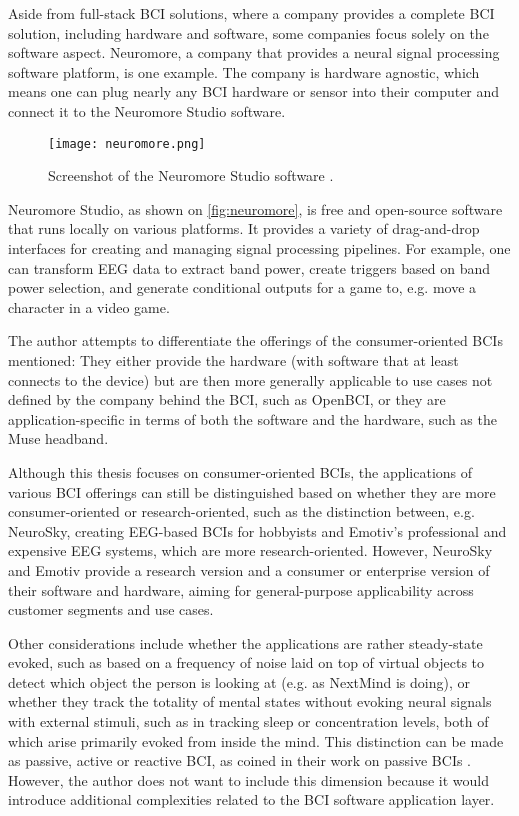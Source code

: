 Aside from full-stack BCI solutions, where a company provides a complete BCI solution, including hardware and software, some companies focus solely on the software aspect. Neuromore, a company that provides a neural signal processing software platform, is one example. The company is hardware agnostic, which means one can plug nearly any BCI hardware or sensor into their computer and connect it to the Neuromore Studio software.

\begin{figure}[ht]
  \centering
  \texttt{[image: neuromore.png]}
  \caption{Screenshot of the Neuromore Studio software \citep{neuromore_neuromore_nodate}.}
  \label{fig:neuromore}
\end{figure}

Neuromore Studio, as shown on \autoref{fig:neuromore}, is free and open-source software that runs locally on various platforms. It provides a variety of drag-and-drop interfaces for creating and managing signal processing pipelines. For example, one can transform EEG data to extract band power, create triggers based on band power selection, and generate conditional outputs for a game to, e.g. move a character in a video game.

The author attempts to differentiate the offerings of the consumer-oriented BCIs mentioned: They either provide the hardware (with software that at least connects to the device) but are then more generally applicable to use cases not defined by the company behind the BCI, such as OpenBCI, or they are application-specific in terms of both the software and the hardware, such as the Muse headband.

Although this thesis focuses on consumer-oriented BCIs, the applications of various BCI offerings can still be distinguished based on whether they are more consumer-oriented or research-oriented, such as the distinction between, e.g. NeuroSky, creating EEG-based BCIs for hobbyists and Emotiv's professional and expensive EEG systems, which are more research-oriented. However, NeuroSky and Emotiv provide a research version and a consumer or enterprise version of their software and hardware, aiming for general-purpose applicability across customer segments and use cases.

Other considerations include whether the applications are rather steady-state evoked, such as based on a frequency of noise laid on top of virtual objects to detect which object the person is looking at (e.g. as NextMind is doing), or whether they track the totality of mental states without evoking neural signals with external stimuli, such as in tracking sleep or concentration levels, both of which arise primarily evoked from inside the mind. This distinction can be made as passive, active or reactive BCI, as \citeauthor{alimardani_passive_2020} coined in their work on passive BCIs \citep{alimardani_passive_2020}. However, the author does not want to include this dimension because it would introduce additional complexities related to the BCI software application layer.

